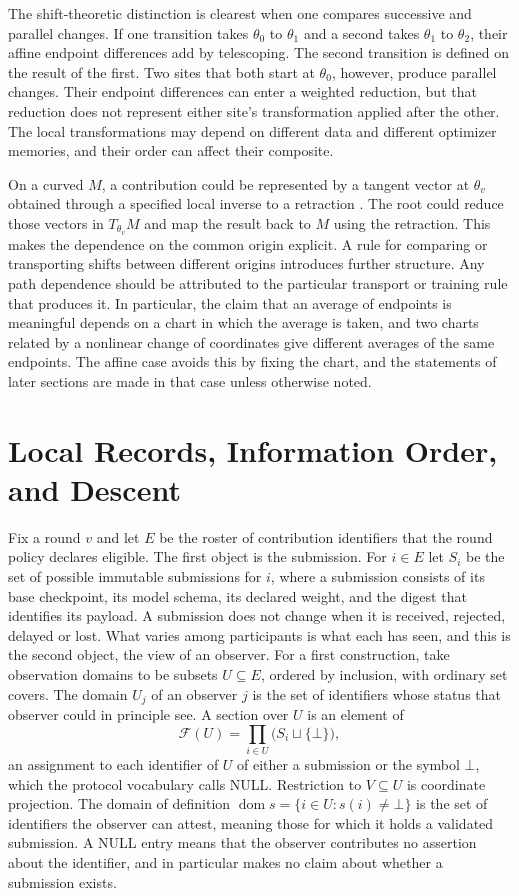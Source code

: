 \documentclass[11pt]{article}
\theoremstyle{definition}
\theoremstyle{remark}
\begin{document}
The shift-theoretic distinction is clearest when one compares successive and parallel changes. If one transition takes $\theta_0$ to $\theta_1$ and a second takes $\theta_1$ to $\theta_2$, their affine endpoint differences add by telescoping. The second transition is defined on the result of the first. Two sites that both start at $\theta_0$, however, produce parallel changes. Their endpoint differences can enter a weighted reduction, but that reduction does not represent either site's transformation applied after the other. The local transformations may depend on different data and different optimizer memories, and their order can affect their composite.

On a curved $M$, a contribution could be represented by a tangent vector at $\theta_v$ obtained through a specified local inverse to a retraction \cite{absil2008}. The root could reduce those vectors in $T_{\theta_v}M$ and map the result back to $M$ using the retraction. This makes the dependence on the common origin explicit. A rule for comparing or transporting shifts between different origins introduces further structure. Any path dependence should be attributed to the particular transport or training rule that produces it. In particular, the claim that an average of endpoints is meaningful depends on a chart in which the average is taken, and two charts related by a nonlinear change of coordinates give different averages of the same endpoints. The affine case avoids this by fixing the chart, and the statements of later sections are made in that case unless otherwise noted.

\section{Local Records, Information Order, and Descent}\label{sec:records}

Fix a round $v$ and let $E$ be the roster of contribution identifiers that the round policy declares eligible. The first object is the submission. For $i\in E$ let $S_i$ be the set of possible immutable submissions for $i$, where a submission consists of its base checkpoint, its model schema, its declared weight, and the digest that identifies its payload. A submission does not change when it is received, rejected, delayed or lost. What varies among participants is what each has seen, and this is the second object, the view of an observer. For a first construction, take observation domains to be subsets $U\subseteq E$, ordered by inclusion, with ordinary set covers. The domain $U_j$ of an observer $j$ is the set of identifiers whose status that observer could in principle see. A section over $U$ is an element of
\[
\mathcal F(U)=\prod_{i\in U}\bigl(S_i\sqcup\{\bot\}\bigr),
\]
an assignment to each identifier of $U$ of either a submission or the symbol $\bot$, which the protocol vocabulary calls NULL. Restriction to $V\subseteq U$ is coordinate projection. The domain of definition $\operatorname{dom}s=\{i\in U:s(i)\neq\bot\}$ is the set of identifiers the observer can attest, meaning those for which it holds a validated submission. A NULL entry means that the observer contributes no assertion about the identifier, and in particular makes no claim about whether a submission exists.
\end{document}
